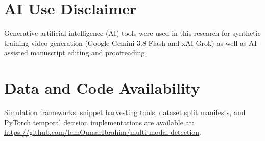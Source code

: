 \documentclass[conference]{IEEEtran}
\begin{document}
\section*{AI Use Disclaimer}
Generative artificial intelligence (AI) tools were used in this research for synthetic training video generation (Google Gemini 3.8 Flash and xAI Grok) as well as AI-assisted manuscript editing and proofreading.

\section*{Data and Code Availability}
Simulation frameworks, snippet harvesting tools, dataset split manifests, and PyTorch temporal decision implementations are available at: \url{https://github.com/IamOumarIbrahim/multi-modal-detection}.



\end{document}
